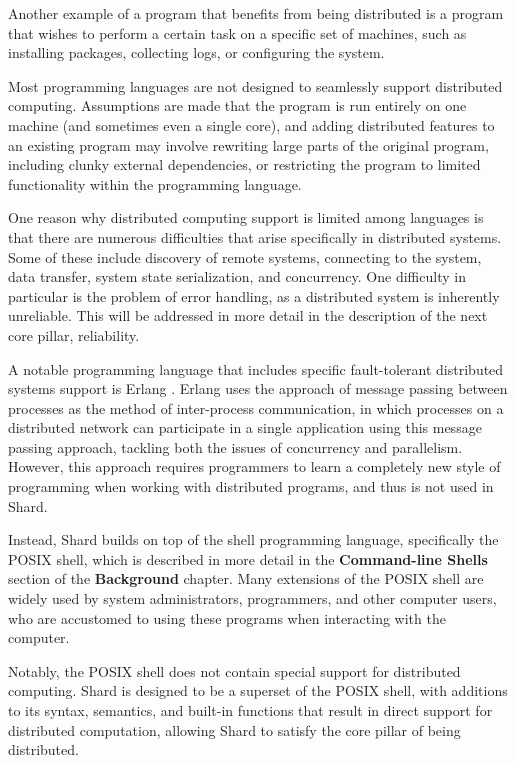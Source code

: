 \documentclass[twoside]{report}
\newcommand{\todoi}[1]{\todo[inline, color=blue!20]{TODO: {#1}}}
\begin{document}
Another example of a program that benefits from being distributed is a program that wishes to perform a certain task on a specific set of machines, such as installing packages, collecting logs, or configuring the system.

Most programming languages are not designed to seamlessly support distributed computing.
Assumptions are made that the program is run entirely on one machine (and sometimes even a single core), and adding distributed features to an existing program may involve rewriting large parts of the original program, including clunky external dependencies, or restricting the program to limited functionality within the programming language.

One reason why distributed computing support is limited among languages is that there are numerous difficulties that arise specifically in distributed systems. Some of these include discovery of remote systems, connecting to the system, data transfer, system state serialization, and concurrency.
One difficulty in particular is the problem of error handling, as a distributed system is inherently unreliable. This will be addressed in more detail in the description of the next core pillar, reliability.

A notable programming language that includes specific fault-tolerant distributed systems support is Erlang \cite{armstrong2010erlang}. Erlang uses the approach of message passing between processes as the method of inter-process communication, in which processes on a distributed network can participate in a single application using this message passing approach, tackling both the issues of concurrency and parallelism.
However, this approach requires programmers to learn a completely new style of programming when working with distributed programs, and thus is not used in Shard.


Instead, Shard builds on top of the shell programming language, specifically the POSIX shell, which is described in more detail in the \textbf{Command-line Shells} section of the \textbf{Background} chapter. Many extensions of the POSIX shell are widely used by system administrators, programmers, and other computer users, who are accustomed to using these programs when interacting with the computer.

Notably, the POSIX shell does not contain special support for distributed computing. Shard is designed to be a superset of the POSIX shell, with additions to its syntax, semantics, and built-in functions that result in direct support for distributed computation, allowing Shard to satisfy the core pillar of being distributed.
\end{document}
